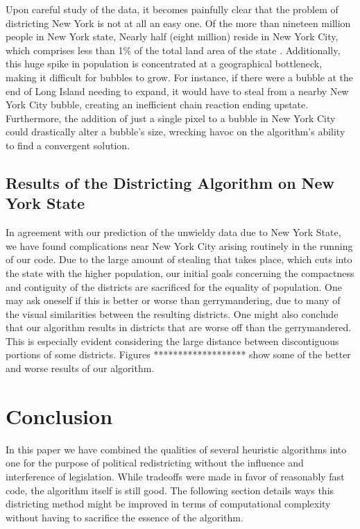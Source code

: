 \documentclass[11pt]{article}				%
\begin{document}
Upon careful study of the data, it becomes painfully clear that the
problem of districting New York is not at all an easy one. Of the more
than nineteen million people in New York state, Nearly half (eight
million) reside in New York City, which comprises less than 1\% of the
total land area of the state \cite{ref:pop}. Additionally, this huge
spike in population is concentrated at a geographical bottleneck, making
it difficult for bubbles to grow. For instance, if there were a bubble at 
the end of Long Island needing to expand, it would have to steal from a
nearby New York City bubble, creating an inefficient chain reaction
ending upstate. Furthermore, the addition of just a single pixel to a
bubble in New York City could drastically alter a bubble's size, wrecking 
havoc on the algorithm's ability to find a convergent solution.

	\subsection{Results of the Districting Algorithm on New York State}
In agreement with our prediction of the unwieldy data due to New York State, we have found complications near New York City arising routinely in the running of our code.  Due to the large amount of stealing that takes place, which cuts into the state with the higher population, our initial goals concerning the compactness and contiguity of the districts are sacrificed for the equality of population.  One may ask oneself if this is better or worse than gerrymandering, due to many of the visual similarities between the resulting districts.  One might also conclude that our algorithm results in districts that are worse off than the gerrymandered. This is especially evident considering the large distance between discontiguous portions of some districts. Figures ******************* show some of the better and worse results of our algorithm.


\section{Conclusion}

In this paper we have combined the qualities of several heuristic
algorithms into one for the purpose of political redistricting without
the influence and interference of legislation. While tradeoffs were made in favor of reasonably fast code, the algorithm itself is still good. The following section details ways this districting method might be improved in terms of computational complexity without having to sacrifice the essence of the algorithm.
\end{document}
